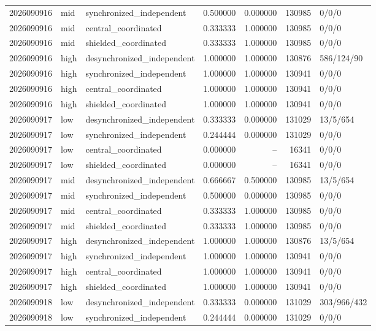 \begin{longtable}{llp{38mm}rrrp{30mm}}
2026090916 & mid & synchronized\_independent & 0.500000 & 0.000000 & 130985 & 0/0/0 \\
2026090916 & mid & central\_coordinated & 0.333333 & 1.000000 & 130985 & 0/0/0 \\
2026090916 & mid & shielded\_coordinated & 0.333333 & 1.000000 & 130985 & 0/0/0 \\
2026090916 & high & desynchronized\_independent & 1.000000 & 1.000000 & 130876 & 586/124/90 \\
2026090916 & high & synchronized\_independent & 1.000000 & 1.000000 & 130941 & 0/0/0 \\
2026090916 & high & central\_coordinated & 1.000000 & 1.000000 & 130941 & 0/0/0 \\
2026090916 & high & shielded\_coordinated & 1.000000 & 1.000000 & 130941 & 0/0/0 \\
2026090917 & low & desynchronized\_independent & 0.333333 & 0.000000 & 131029 & 13/5/654 \\
2026090917 & low & synchronized\_independent & 0.244444 & 0.000000 & 131029 & 0/0/0 \\
2026090917 & low & central\_coordinated & 0.000000 & -- & 16341 & 0/0/0 \\
2026090917 & low & shielded\_coordinated & 0.000000 & -- & 16341 & 0/0/0 \\
2026090917 & mid & desynchronized\_independent & 0.666667 & 0.500000 & 130985 & 13/5/654 \\
2026090917 & mid & synchronized\_independent & 0.500000 & 0.000000 & 130985 & 0/0/0 \\
2026090917 & mid & central\_coordinated & 0.333333 & 1.000000 & 130985 & 0/0/0 \\
2026090917 & mid & shielded\_coordinated & 0.333333 & 1.000000 & 130985 & 0/0/0 \\
2026090917 & high & desynchronized\_independent & 1.000000 & 1.000000 & 130876 & 13/5/654 \\
2026090917 & high & synchronized\_independent & 1.000000 & 1.000000 & 130941 & 0/0/0 \\
2026090917 & high & central\_coordinated & 1.000000 & 1.000000 & 130941 & 0/0/0 \\
2026090917 & high & shielded\_coordinated & 1.000000 & 1.000000 & 130941 & 0/0/0 \\
2026090918 & low & desynchronized\_independent & 0.333333 & 0.000000 & 131029 & 303/966/432 \\
2026090918 & low & synchronized\_independent & 0.244444 & 0.000000 & 131029 & 0/0/0 \\

\end{longtable}
